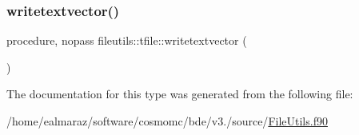 \mbox{\label{structfileutils_1_1tfile_acc48d97e24439f19601ffcd14e133c2c}} 
\subsubsection{\texorpdfstring{writetextvector()}{writetextvector()}}
{\footnotesize\ttfamily procedure, nopass fileutils\+::tfile\+::writetextvector (\begin{DoxyParamCaption}{ }\end{DoxyParamCaption})\hspace{0.3cm}{\ttfamily [private]}}



The documentation for this type was generated from the following file\+:\begin{DoxyCompactItemize}
\item 
/home/ealmaraz/software/cosmomc/bde/v3./source/\mbox{\hyperlink{FileUtils_8f90}{File\+Utils.\+f90}}\end{DoxyCompactItemize}
